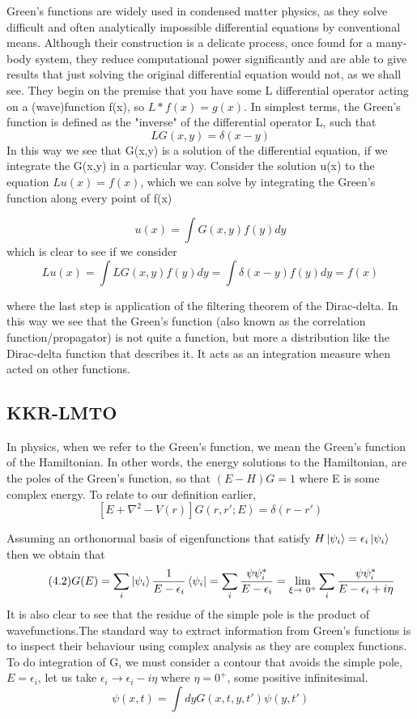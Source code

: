 \documentclass[12pt]{article}
\begin{document}
Green's functions are widely used in condensed matter physics, as they solve difficult and often analytically impossible differential equations by conventional means. Although their construction is a delicate process, once found for a many-body system, they reduce computational power significantly and are able to give results that just solving the original differential equation would not, as we shall see. They begin on the premise that you have some L differential operator acting on a (wave)function f(x), so $L*f(x)=g(x)$. In simplest terms, the Green's function is defined as the "inverse" of the differential operator L, such that 
$$LG(x,y)=\delta (x-y)$$
In this way we see that G(x,y) is a solution of the differential equation, if we integrate the G(x,y) in a particular way. Consider the solution u(x) to the equation $Lu(x)=f(x)$, which we can solve by integrating the Green's function along every point of f(x)

$$u(x)=\int G(x,y)f(y)dy$$
which is clear to see if we consider 
$$Lu(x)=\int LG(x,y)f(y)dy=\int \delta(x-y)f(y)dy =f(x)$$

where the last step is application of the filtering theorem of the Dirac-delta. In this way we see that the Green's function (also known as the correlation function/propagator) is not quite a function, but more a distribution like the Dirac-delta function that describes it. It acts as an integration measure when acted on other functions.

\subsection{KKR-LMTO}

In physics, when we refer to the Green's function, we mean the Green's function of the Hamiltonian. In other words, the energy solutions to the Hamiltonian, are the poles of the Green's function, so that $(E-H)G=1$ where E is some complex energy. To relate to our definition earlier,
\begin{equation} \label{4.1} \tag{4.1}
[E+\nabla^2 -V(r)]G(r,r';E)=\delta (r-r')
\end{equation}

Assuming an orthonormal basis of eigenfunctions that satisfy $H\ket{\psi_i}=\epsilon_i \ket{\psi_i}$ then we obtain that 
\begin{equation} \label{4.1} \tag{4.2}
G(E) = \sum_i \ket{\psi_i} \frac{1}{E-\epsilon_i} \bra{\psi_i}=\sum_i \frac{\psi \psi_i^*}{E-\epsilon_i}=\lim_{\xi\to\ 0^+} \sum_i \frac{\psi \psi_i^*}{E-\epsilon_i+i\eta}
\end{equation}
It is also clear to see that the residue of the simple pole is the product of wavefunctions.The standard way to extract information from Green's functions is to inspect their behaviour using complex analysis as they are complex functions. To do integration of G, we must consider a contour that avoids the simple pole, $E=\epsilon_i$, let us take $\epsilon_i \rightarrow \epsilon_i-i\eta$ where $\eta=0^+$, some positive infinitesimal.
\begin{equation} \label{4.1} \tag{4.3}
\psi(x,t)=\int dy G(x,t,y,t')\psi(y,t')
\end{equation}
\end{document}
